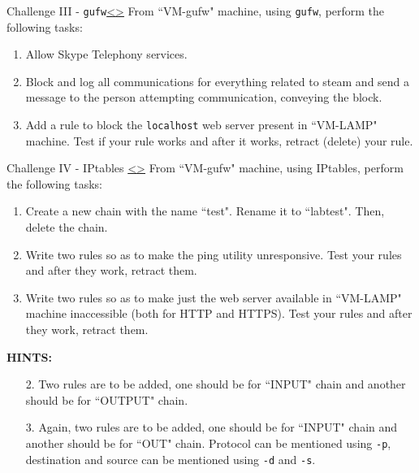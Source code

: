 \documentclass[12pt]{extarticle}
\newenvironment{instructionblock}{\Large\bgroup}{\egroup}
\begin{document}
\pagebreak
\begin{slide}{ Challenge III - \texttt{gufw}}{\hyperref[slide 19]{\textless}\hyperref[slide 21]{\textgreater}}
\vskip 5pt
\begin{instructionblock}
From ``VM-gufw" machine, using \texttt{gufw}, perform the following tasks:
\begin{enumerate}
\item Allow Skype Telephony services.
\item Block and log all communications for everything related to steam and send a message to the person attempting communication, conveying the block.
\item Add a rule to block the \texttt{localhost} web server present in ``VM-LAMP" machine. Test if your rule works and after it works, retract (delete) your rule.
\end{enumerate}
\end{instructionblock}
\end{slide}




\pagebreak
\begin{slide}{ Challenge IV - IPtables }{\hyperref[slide 20]{\textless}\hyperref[slide 22]{\textgreater}}
\vskip 5pt
\begin{instructionblock}
From ``VM-gufw" machine, using IPtables, perform the following tasks:
\begin{enumerate}
\item {Create a new chain with the name ``test". Rename it to ``labtest". Then, delete the chain.}
\item {Write two rules so as to make the ping utility unresponsive. Test your rules and after they work, retract them. }
\item { Write two rules so as to make just the web server available in ``VM-LAMP" machine inaccessible (both for HTTP and HTTPS). Test your rules and after they work, retract them.  }
\end{enumerate}
\end{instructionblock}
\end{slide}

\vspace{2mm}
\noindent
\textbf{HINTS:}
\begin{enumerate}
\item[2.] Two rules are to be added, one should be for ``INPUT" chain and another should be for ``OUTPUT" chain.   
\item[3.] { Again, two rules are to be added, one should be for ``INPUT" chain and another should be for ``OUT" chain. Protocol can be mentioned using \texttt{-p}, destination and source can be mentioned using \texttt{-d} and \texttt{-s}. }
\end{enumerate}
\end{document}
